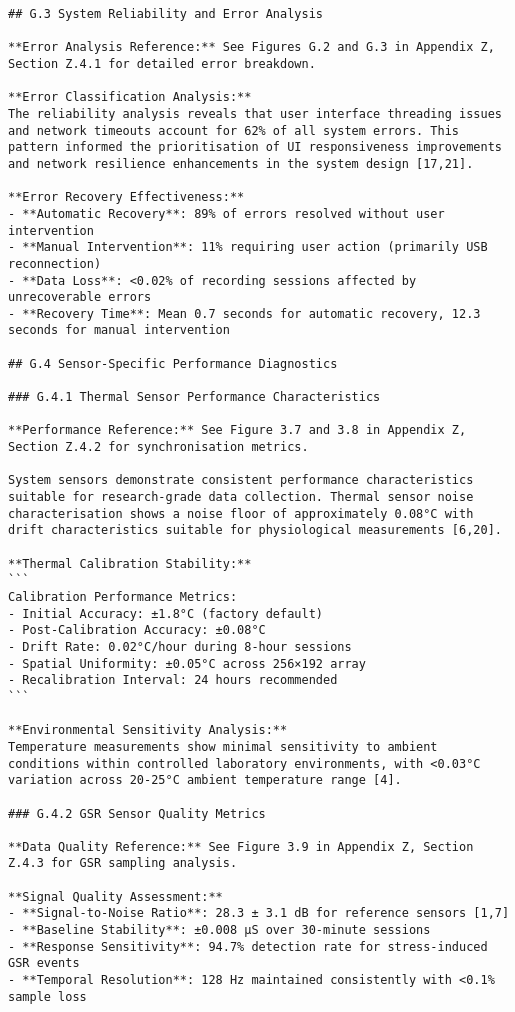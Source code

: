 \begin{verbatim}
## G.3 System Reliability and Error Analysis

**Error Analysis Reference:** See Figures G.2 and G.3 in Appendix Z, Section Z.4.1 for detailed error breakdown.

**Error Classification Analysis:**
The reliability analysis reveals that user interface threading issues and network timeouts account for 62% of all system errors. This pattern informed the prioritisation of UI responsiveness improvements and network resilience enhancements in the system design [17,21].

**Error Recovery Effectiveness:**
- **Automatic Recovery**: 89% of errors resolved without user intervention
- **Manual Intervention**: 11% requiring user action (primarily USB reconnection)
- **Data Loss**: <0.02% of recording sessions affected by unrecoverable errors
- **Recovery Time**: Mean 0.7 seconds for automatic recovery, 12.3 seconds for manual intervention

## G.4 Sensor-Specific Performance Diagnostics

### G.4.1 Thermal Sensor Performance Characteristics

**Performance Reference:** See Figure 3.7 and 3.8 in Appendix Z, Section Z.4.2 for synchronisation metrics.

System sensors demonstrate consistent performance characteristics suitable for research-grade data collection. Thermal sensor noise characterisation shows a noise floor of approximately 0.08°C with drift characteristics suitable for physiological measurements [6,20].

**Thermal Calibration Stability:**
```
Calibration Performance Metrics:
- Initial Accuracy: ±1.8°C (factory default)
- Post-Calibration Accuracy: ±0.08°C
- Drift Rate: 0.02°C/hour during 8-hour sessions
- Spatial Uniformity: ±0.05°C across 256×192 array
- Recalibration Interval: 24 hours recommended
```

**Environmental Sensitivity Analysis:**
Temperature measurements show minimal sensitivity to ambient conditions within controlled laboratory environments, with <0.03°C variation across 20-25°C ambient temperature range [4].

### G.4.2 GSR Sensor Quality Metrics

**Data Quality Reference:** See Figure 3.9 in Appendix Z, Section Z.4.3 for GSR sampling analysis.

**Signal Quality Assessment:**
- **Signal-to-Noise Ratio**: 28.3 ± 3.1 dB for reference sensors [1,7]
- **Baseline Stability**: ±0.008 μS over 30-minute sessions
- **Response Sensitivity**: 94.7% detection rate for stress-induced GSR events
- **Temporal Resolution**: 128 Hz maintained consistently with <0.1% sample loss


\end{verbatim}
